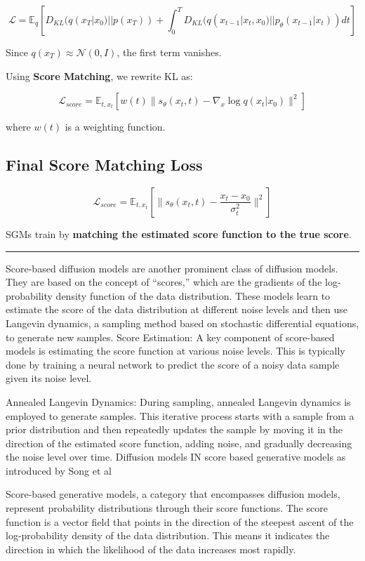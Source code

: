 \documentclass[
]{book}
\begin{document}
\[
\mathcal{L} = \mathbb{E}_q \left[ D_{KL} (q(x_T | x_0) || p(x_T)) + \int_0^T D_{KL} (q(x_{t-1} | x_t, x_0) || p_\theta(x_{t-1} | x_t)) dt \right]
\]

Since \(q(x_T) \approx \mathcal{N}(0, I)\), the first term vanishes.

Using \textbf{Score Matching}, we rewrite KL as:

\[
\mathcal{L}_{score} = \mathbb{E}_{t, x_t} \left[ w(t) \| s_\theta(x_t, t) - \nabla_x \log q(x_t | x_0) \|^2 \right]
\]

where \(w(t)\) is a weighting function.

\subsection{\texorpdfstring{\textbf{Final Score Matching Loss}}{Final Score Matching Loss}}\label{final-score-matching-loss}

\[
\mathcal{L}_{score} = \mathbb{E}_{t, x_t} \left[ \| s_\theta(x_t, t) - \frac{x_t - x_0}{\sigma_t^2} \|^2 \right]
\]

SGMs train by \textbf{matching the estimated score function to the true score}.

\begin{center}\rule{0.5\linewidth}{0.5pt}\end{center}

Score-based diffusion models are another prominent class of diffusion models. They are based on the concept of ``scores,'' which are the gradients of the log-probability density function of the data distribution. These models learn to estimate the score of the data distribution at different noise levels and then use Langevin dynamics, a sampling method based on stochastic differential equations, to generate new samples.
Score Estimation: A key component of score-based models is estimating the score function at various noise levels. This is typically done by training a neural network to predict the score of a noisy data sample given its noise level.

Annealed Langevin Dynamics: During sampling, annealed Langevin dynamics is employed to generate samples. This iterative process starts with a sample from a prior distribution and then repeatedly updates the sample by moving it in the direction of the estimated score function, adding noise, and gradually decreasing the noise level over time.
Diffusion models IN score based generative models as introduced by Song et al

Score-based generative models, a category that encompasses diffusion models, represent probability distributions through their score functions. The score function is a vector field that points in the direction of the steepest ascent of the log-probability density of the data distribution. This means it indicates the direction in which the likelihood of the data increases most rapidly.
\end{document}
